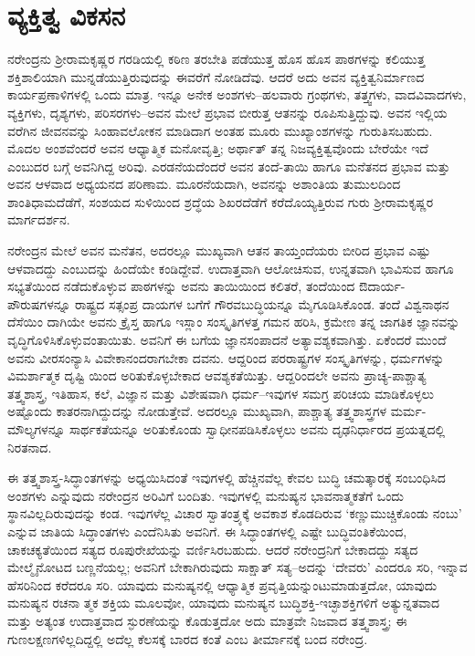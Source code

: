 
\chapter{ವ್ಯಕ್ತಿತ್ವ ವಿಕಸನ}

\noindent

ನರೇಂದ್ರನು ಶ್ರೀರಾಮಕೃಷ್ಣರ ಗರಡಿಯಲ್ಲಿ ಕಠಿಣ ತರಬೇತಿ ಪಡೆಯುತ್ತ ಹೊಸ ಹೊಸ ಪಾಠಗಳನ್ನು ಕಲಿಯುತ್ತ ಶಕ್ತಿಶಾಲಿಯಾಗಿ ಮುನ್ನಡೆಯುತ್ತಿರುವುದನ್ನು ಈವರೆಗೆ ನೋಡಿದೆವು. ಆದರೆ ಅದು ಅವನ ವ್ಯಕ್ತಿತ್ವನಿರ್ಮಾಣದ ಕಾರ್ಯಪ್ರಣಾಳಿಗಳಲ್ಲಿ ಒಂದು ಮಾತ್ರ. ಇನ್ನೂ ಅನೇಕ ಅಂಶಗಳು–ಹಲವಾರು ಗ್ರಂಥಗಳು, ತತ್ತ್ವಗಳು, ವಾದವಿವಾದಗಳು, ವ್ಯಕ್ತಿಗಳು, ದೃಶ್ಯಗಳು, ಪರಿಸರಗಳು–ಅವನ ಮೇಲೆ ಪ್ರಭಾವ ಬೀರುತ್ತ ಆತನನ್ನು ರೂಪಿಸುತ್ತಿದ್ದುವು. ಅವನ ಇಲ್ಲಿಯ ವರೆಗಿನ ಜೀವನವನ್ನು ಸಿಂಹಾವಲೋಕನ ಮಾಡಿದಾಗ ಅಂತಹ ಮೂರು ಮುಖ್ಯಾಂಶಗಳನ್ನು ಗುರುತಿಸಬಹುದು. ಮೊದಲ ಅಂಶವೆಂದರೆ ಅವನ ಆಧ್ಯಾತ್ಮಿಕ ಮನೋವೃತ್ತಿ; ಅರ್ಥಾತ್ ತನ್ನ ನಿಜವ್ಯಕ್ತಿತ್ವವೊಂದು ಬೇರೆಯೇ ಇದೆ ಎಂಬುದರ ಬಗ್ಗೆ ಅವನಿಗಿದ್ದ ಅರಿವು. ಎರಡನೆಯದೆಂದರೆ ಅವನ ತಂದೆ-ತಾಯಿ ಹಾಗೂ ಮನೆತನದ ಪ್ರಭಾವ ಮತ್ತು ಅವನ ಆಳವಾದ ಅಧ್ಯಯನದ ಪರಿಣಾಮ. ಮೂರನೆಯದಾಗಿ, ಅವನನ್ನು ಅಶಾಂತಿಯ ತುಮುಲದಿಂದ ಶಾಂತಿಧಾಮದೆಡೆಗೆ, ಸಂಶಯದ ಸುಳಿಯಿಂದ ಶ್ರದ್ಧೆಯ ಶಿಖರದೆಡೆಗೆ ಕರೆದೊಯ್ಯತ್ತಿರುವ ಗುರು ಶ್ರೀರಾಮಕೃಷ್ಣರ ಮಾರ್ಗದರ್ಶನ.

ನರೇಂದ್ರನ ಮೇಲೆ ಅವನ ಮನೆತನ, ಅದರಲ್ಲೂ ಮುಖ್ಯವಾಗಿ ಆತನ ತಾಯ್ತಂದೆಯರು ಬೀರಿದ ಪ್ರಭಾವ ಎಷ್ಟು ಆಳವಾದದ್ದು ಎಂಬುದನ್ನು ಹಿಂದೆಯೇ ಕಂಡಿದ್ದೇವೆ. ಉದಾತ್ತವಾಗಿ ಆಲೋಚಿಸುವ, ಉನ್ನತವಾಗಿ ಭಾವಿಸುವ ಹಾಗೂ ಸಭ್ಯತೆಯಿಂದ ನಡೆದುಕೊಳ್ಳುವ ಪಾಠಗಳನ್ನು ಅವನು ತಾಯಿಯಿಂದ ಕಲಿತರೆ, ತಂದೆಯಿಂದ ಔದಾರ್ಯ-ಪೌರುಷಗಳನ್ನೂ ರಾಷ್ಟ್ರದ ಸತ್ಸಂಪ್ರ ದಾಯಗಳ ಬಗೆಗೆ ಗೌರವಬುದ್ಧಿಯನ್ನೂ ಮೈಗೂಡಿಸಿಕೊಂಡ. ತಂದೆ ವಿಶ್ವನಾಥನ ದೆಸೆಯಿಂ ದಾಗಿಯೇ ಅವನು ಕ್ರೈಸ್ತ ಹಾಗೂ ಇಸ್ಲಾಂ ಸಂಸ್ಕೃತಿಗಳತ್ತ ಗಮನ ಹರಿಸಿ, ಕ್ರಮೇಣ ತನ್ನ ಜಾಗತಿಕ ಜ್ಞಾನವನ್ನು ವೃದ್ಧಿಗೊಳಿಸಿಕೊಳ್ಳುವಂತಾಯಿತು. ಅವನಿಗೆ ಈ ಬಗೆಯ ಜ್ಞಾನಸಂಪಾದನೆ ಅತ್ಯಾವಶ್ಯಕವಾಗಿತ್ತು. ಏಕೆಂದರೆ ಮುಂದೆ ಅವನು ವೀರಸಂನ್ಯಾಸಿ ವಿವೇಕಾನಂದರಾಗಬೇಕಾ ದವನು. ಆದ್ದರಿಂದ ಪರರಾಷ್ಟ್ರಗಳ ಸಂಸ್ಕೃತಿಗಳನ್ನು, ಧರ್ಮಗಳನ್ನು ವಿಮರ್ಶಾತ್ಮಕ ದೃಷ್ಟಿ ಯಿಂದ ಅರಿತುಕೊಳ್ಳಬೇಕಾದ ಆವಶ್ಯಕತೆಯಿತ್ತು. ಆದ್ದರಿಂದಲೇ ಅವನು ಪ್ರಾಚ್ಯ-ಪಾಶ್ಚಾತ್ಯ ತತ್ತ್ವಶಾಸ್ತ್ರ, ಇತಿಹಾಸ, ಕಲೆ, ವಿಜ್ಞಾನ ಮತ್ತು ವಿಶೇಷವಾಗಿ ಧರ್ಮ–ಇವುಗಳ ಸಮಗ್ರ ಪರಿಚಯ ಮಾಡಿಕೊಳ್ಳಲು ಅಷ್ಟೊಂದು ಕಾತರನಾಗಿದ್ದುದನ್ನು ನೋಡುತ್ತೇವೆ. ಅದರಲ್ಲೂ ಮುಖ್ಯವಾಗಿ, ಪಾಶ್ಚಾತ್ಯ ತತ್ತ್ವಶಾಸ್ತ್ರಗಳ ಮರ್ಮ-ಮೌಲ್ಯಗಳನ್ನೂ ಸಾರ್ಥಕತೆಯನ್ನೂ ಅರಿತುಕೊಂಡು ಸ್ವಾಧೀನಪಡಿಸಿಕೊಳ್ಳಲು ಅವನು ದೃಢನಿರ್ಧಾರದ ಪ್ರಯತ್ನದಲ್ಲಿ ನಿರತನಾದ.

ಈ ತತ್ತ್ವಶಾಸ್ತ್ರ-ಸಿದ್ಧಾಂತಗಳನ್ನು ಅಧ್ಯಯಿಸಿದಂತೆ ಇವುಗಳಲ್ಲಿ ಹೆಚ್ಚಿನವೆಲ್ಲ ಕೇವಲ ಬುದ್ಧಿ ಚಮತ್ಕಾರಕ್ಕೆ ಸಂಬಂಧಿಸಿದ ಅಂಶಗಳು ಎನ್ನುವುದು ನರೇಂದ್ರನ ಅರಿವಿಗೆ ಬಂದಿತು. ಇವುಗಳಲ್ಲಿ ಮನುಷ್ಯನ ಭಾವನಾತ್ಮಕತೆಗೆ ಒಂದು ಸ್ಥಾನವಿಲ್ಲದಿರುವುದನ್ನು ಕಂಡ. ಇವುಗಳೆಲ್ಲ ವಿಚಾರ ಸ್ವಾತಂತ್ರ್ಯಕ್ಕೆ ಅವಕಾಶ ಕೊಡದಿರುವ ‘ಕಣ್ಣುಮುಚ್ಚಿಕೊಂಡು ನಂಬು’ ಎನ್ನುವ ಜಾತಿಯ ಸಿದ್ಧಾಂತಗಳು ಎಂದೆನಿಸಿತು ಅವನಿಗೆ. ಈ ಸಿದ್ಧಾಂತಗಳಲ್ಲಿ ಎಷ್ಟೇ ಬುದ್ಧಿವಂತಿಕೆಯಿಂದ, ಚಾಕಚಕ್ಯತೆಯಿಂದ ಸತ್ಯದ ರೂಪುರೇಖೆಯನ್ನು ವರ್ಣಿಸಿರಬಹುದು. ಆದರೆ ನರೇಂದ್ರನಿಗೆ ಬೇಕಾದದ್ದು ಸತ್ಯದ ಮೇಲ್ಮೈನೋಟದ ಬಣ್ಣನೆಯಲ್ಲ; ಅವನಿಗೆ ಬೇಕಾಗಿರುವುದು ಸಾಕ್ಷಾತ್ ಸತ್ಯ–ಅದನ್ನು ‘ದೇವರು’ ಎಂದರೂ ಸರಿ, ಇನ್ನಾವ ಹೆಸರಿನಿಂದ ಕರೆದರೂ ಸರಿ. ಯಾವುದು ಮನುಷ್ಯನಲ್ಲಿ ಆಧ್ಯಾತ್ಮಿಕ ಪ್ರವೃತ್ತಿಯನ್ನುಂಟುಮಾಡುತ್ತದೋ, ಯಾವುದು ಮನುಷ್ಯನ ರಚನಾ ತ್ಮಕ ಶಕ್ತಿಯ ಮೂಲವೋ, ಯಾವುದು ಮನುಷ್ಯನ ಬುದ್ಧಿಶಕ್ತಿ-ಇಚ್ಛಾಶಕ್ತಿಗಳಿಗೆ ಅತ್ಯುನ್ನತವಾದ ಮತ್ತು ಅತ್ಯಂತ ಉದಾತ್ತವಾದ ಸ್ಫುರಣೆಯನ್ನು ಕೊಡುತ್ತದೋ ಅದು ಮಾತ್ರವೇ ನಿಜವಾದ ತತ್ತ್ವಶಾಸ್ತ್ರ; ಈ ಗುಣಲಕ್ಷಣಗಳಿಲ್ಲದಿದ್ದಲ್ಲಿ ಅದೆಲ್ಲ ಕೆಲಸಕ್ಕೆ ಬಾರದ ಕಂತೆ ಎಂಬ ತೀರ್ಮಾನಕ್ಕೆ ಬಂದ ನರೇಂದ್ರ.

